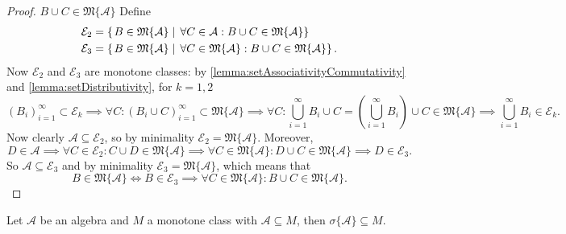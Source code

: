 \begin{proof}
$\boxed{B\cup C \in \mathfrak{M}\{\mathcal{A}\}}$ Define
\begin{align*}
\mathcal{E}_2 &= \left\{\left. B\in\mathfrak{M}\{\mathcal{A}\} \;\right|\; \forall C\in\mathcal{A}: B\cup C \in\mathfrak{M}\{\mathcal{A}\} \right\} \\
\mathcal{E}_3 &= \left\{\left. B\in\mathfrak{M}\{\mathcal{A}\} \;\right|\; \forall C\in\mathfrak{M}\{\mathcal{A}\}: B\cup C \in\mathfrak{M}\{\mathcal{A}\} \right\}.
\end{align*}
Now $\mathcal{E}_2$ and $\mathcal{E}_3$ are monotone classes: by \ref{lemma:setAssociativityCommutativity} and \ref{lemma:setDistributivity}, for $k=1,2$
\[ (B_i)_{i=1}^\infty\subset \mathcal{E}_k \implies \forall C: (B_i\cup C)_{i=1}^\infty\subset \mathfrak{M}\{\mathcal{A}\} \implies \forall C: \bigcup_{i=1}^\infty B_i\cup C = \left(\bigcup_{i=1}^\infty B_i\right)\cup C \in\mathfrak{M}\{\mathcal{A}\} \implies \bigcup_{i=1}^\infty B_i \in \mathcal{E}_k. \]
Now clearly $\mathcal{A}\subseteq\mathcal{E}_2$, so by minimality $\mathcal{E}_2 = \mathfrak{M}\{\mathcal{A}\}$. Moreover,
\[ D\in\mathcal{A}\implies \forall C\in \mathcal{E}_2: C\cup D\in \mathfrak{M}\{\mathcal{A}\} \implies \forall C\in \mathfrak{M}\{\mathcal{A}\}: D\cup C\in \mathfrak{M}\{\mathcal{A}\} \implies D\in \mathcal{E}_3. \]
So $\mathcal{A}\subseteq\mathcal{E}_3$ and by minimality $\mathcal{E}_3 = \mathfrak{M}\{\mathcal{A}\}$, which means that
\[ B\in\mathfrak{M}\{\mathcal{A}\} \iff B\in\mathcal{E}_3 \implies \forall C\in\mathfrak{M}\{\mathcal{A}\}: B\cup C\in\mathfrak{M}\{\mathcal{A}\}. \]
\end{proof}
\begin{corollary}
Let $\mathcal{A}$ be an algebra and $M$ a monotone class with $\mathcal{A}\subseteq M$, then $\sigma\{\mathcal{A}\}\subseteq M$.
\end{corollary}

